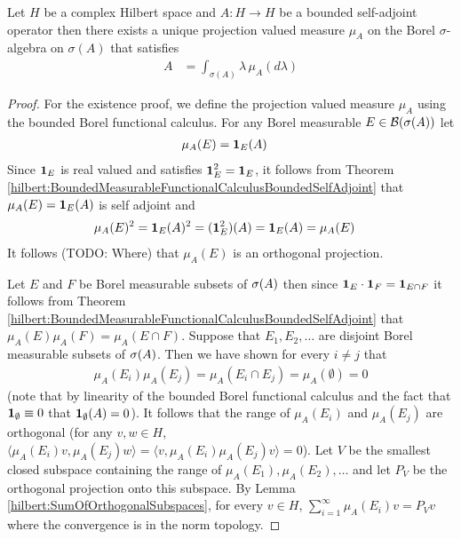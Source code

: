 \begin{thm}\label{hilbert:SpectralTheoremBoundSelfAdjointProjectionValuedMeasure}Let $H$ be a complex Hilbert space and $A : H \to H$ be a bounded self-adjoint operator then there exists a unique projection valued measure $\mu_A$ on the Borel $\sigma$-algebra on $\sigma(A)$ that satisfies
\begin{align*}
A &= \int_{\sigma(A)} \lambda  \, \mu_A(d\lambda)
\end{align*}
\end{thm}
\begin{proof}
For the existence proof, we define the projection valued measure $\mu_A$ using the bounded Borel functional calculus.  For any Borel measurable $E \in \mathcal{B}(\sigma(A))$ let
\begin{align*}
\mu_A(E) &= \textbf{1}_{E}(A)
\end{align*}
Since $\textbf{1}_{E}$ is real valued and satisfies
$\textbf{1}_{E}^2  = \textbf{1}_{E}$, it follows from Theorem
\ref{hilbert:BoundedMeasurableFunctionalCalculusBoundedSelfAdjoint}
that $\mu_A(E) = \textbf{1}_{E}(A)$ is self adjoint and 
\begin{align*}
\mu_A(E)^2 &= \textbf{1}_{E}(A)^2 = (\textbf{1}_{E}^2)(A) = \textbf{1}_{E}(A) = \mu_A(E)
\end{align*}  
It follows (TODO: Where) that $\mu_A(E)$ is an orthogonal projection.

Let $E$ and $F$ be Borel measurable subsets of $\sigma(A)$ then since $\textbf{1}_{E} \cdot \textbf{1}_{F} = \textbf{1}_{E \cap F}$ it follows from Theorem \ref{hilbert:BoundedMeasurableFunctionalCalculusBoundedSelfAdjoint} that $\mu_A(E) \mu_A(F) = \mu_A(E \cap F)$.  Suppose that $E_1, E_2, \dotsc$ are disjoint Borel measurable subsets of $\sigma(A)$.  Then we have shown for every $i \neq j$ that 
\begin{align*}
\mu_A(E_i) \mu_A(E_j) = \mu_A(E_i \cap E_j) = \mu_A(\emptyset) = 0
\end{align*}
(note that by linearity of the bounded Borel functional calculus and the fact that $\textbf{1}_{\emptyset} \equiv 0$ that $\textbf{1}_{\emptyset}(A) = 0$).  It follows that the range of $\mu_A(E_i)$ and $\mu_A(E_j)$ are orthogonal (for any $v,w \in H$, $\langle \mu_A(E_i) v, \mu_A(E_j) w \rangle = \langle v, \mu_A(E_i) \mu_A(E_j) v \rangle = 0$).  Let $V$ be the smallest closed subspace containing the range of $\mu_A(E_1), \mu_A(E_2), \dotsc$ and let $P_V$ be the orthogonal projection onto this subspace.  By Lemma \ref{hilbert:SumOfOrthogonalSubspaces}, for every $v \in H$, $\sum_{i=1}^\infty \mu_A(E_i)v = P_V v$ where the convergence is in the norm topology.


\end{proof}
